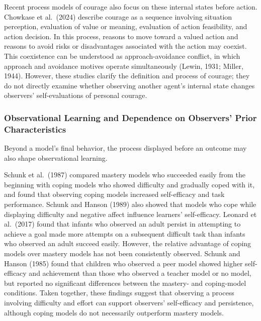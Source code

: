 \documentclass[
]{article}
\begin{document}
Recent process models of courage also focus on these internal states
before action. Chowkase et al.~(2024) describe courage as a sequence
involving situation perception, evaluation of value or meaning,
evaluation of action feasibility, and action decision. In this process,
reasons to move toward a valued action and reasons to avoid risks or
disadvantages associated with the action may coexist. This coexistence
can be understood as approach-avoidance conflict, in which approach and
avoidance motives operate simultaneously (Lewin, 1931; Miller, 1944).
However, these studies clarify the definition and process of courage;
they do not directly examine whether observing another agent's internal
state changes observers' self-evaluations of personal courage.

\subsubsection{Observational Learning and Dependence on Observers' Prior
Characteristics}\label{observational-learning-and-dependence-on-observers-prior-characteristics}

Beyond a model's final behavior, the process displayed before an outcome
may also shape observational learning.

Schunk et al.~(1987) compared mastery models who succeeded easily from
the beginning with coping models who showed difficulty and gradually
coped with it, and found that observing coping models increased
self-efficacy and task performance. Schunk and Hanson (1989) also showed
that models who cope while displaying difficulty and negative affect
influence learners' self-efficacy. Leonard et al.~(2017) found that
infants who observed an adult persist in attempting to achieve a goal
made more attempts on a subsequent difficult task than infants who
observed an adult succeed easily. However, the relative advantage of
coping models over mastery models has not been consistently observed.
Schunk and Hanson (1985) found that children who observed a peer model
showed higher self-efficacy and achievement than those who observed a
teacher model or no model, but reported no significant differences
between the mastery- and coping-model conditions. Taken together, these
findings suggest that observing a process involving difficulty and
effort can support observers' self-efficacy and persistence, although
coping models do not necessarily outperform mastery models.
\end{document}
